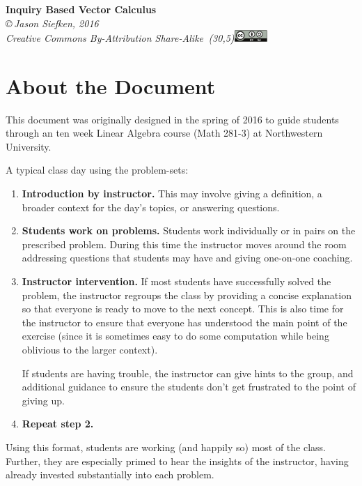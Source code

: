 \documentclass{problemset}
\begin{document}
\pagestyle{empty}

\begin{center}
{\huge\bf Inquiry Based Vector Calculus}\\

\vspace{.7in}
{
\it \copyright\,Jason Siefken, 2016 \\
Creative Commons By-Attribution Share-Alike\, \makebox(30,5){\includegraphics[height=1.2em]{by-sa.pdf}}
}
\end{center}

\section*{About the Document}

	This document was originally designed in the spring of 2016 to guide students
	through an ten week Linear Algebra course (Math 281-3) at
	Northwestern University.  

	A typical class day using the problem-sets:
	\begin{enumerate}
		\item {\bf Introduction by instructor.} This may involve giving a definition,
			a broader context for the day's topics, or answering questions.
		\item {\bf Students work on problems.} Students work individually or in pairs
			on the prescribed problem.  During this time the instructor moves around
			the room addressing questions that students may have and giving one-on-one
			coaching.
		\item {\bf Instructor intervention.} If most students have successfully solved the 
			problem, the instructor regroups the class by providing a concise 
			explanation so that everyone is ready to move to the next concept.  This
			is also time for the instructor to ensure that everyone has understood the
			main point of the exercise (since it is sometimes easy to do some computation
			while being oblivious to the larger context).

			If students are having trouble, the instructor can give hints to the group,
			and additional guidance to ensure the students don't get frustrated
			to the point of giving up.
		\item {\bf Repeat step 2.}
	\end{enumerate}

	Using this format, students are working (and happily so) most of the class.
	Further, they are especially primed to hear the insights of the instructor, 
	having already invested substantially into each problem.
\end{document}
